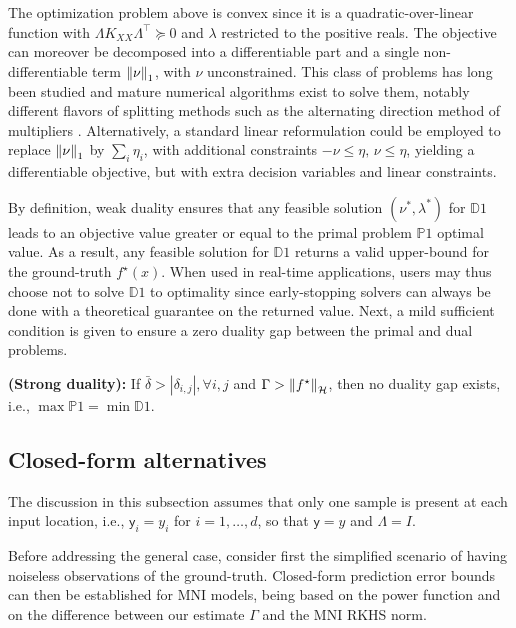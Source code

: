 The optimization problem above is convex since it is a quadratic-over-linear function with $\Lambda K_{XX} \Lambda^\top \succeq 0$ and $\lambda$ restricted to the positive reals. The objective can moreover be decomposed into a differentiable part and a single non-differentiable term $\left\| \nu \right\|_1$, with $\nu$ unconstrained. This class of problems has long been studied and mature numerical algorithms exist to solve them, notably different flavors of splitting methods such as the alternating direction method of multipliers \cite[§6]{boyd2011distributed}. Alternatively, a standard linear reformulation could be employed to replace $\left\| \nu \right\|_1$ by $\sum_i \eta_i$, with additional constraints $-\nu \leq \eta, \, \nu \leq \eta$, yielding a differentiable objective, but with extra decision variables and linear constraints. 

By definition, weak duality \citep[§5]{bertsekas2009convex} ensures that any feasible solution $(\nu^*,\lambda^*)$ for $\mathds{D}1$ leads to an objective value greater or equal to the primal problem $\mathds{P}1$ optimal value. As a result, any feasible solution for $\mathds{D}1$ returns a valid upper-bound for the ground-truth  $f^\star(x)$. When used in real-time applications, users may thus choose not to solve $\mathds{D}1$ to optimality since early-stopping solvers can always be done with a theoretical guarantee on the returned value. Next, a mild sufficient condition is given to ensure a zero duality gap between the primal and dual problems.

\begin{proposition}
	\label{prop.strong_duality}
	{\normalfont \textbf{(Strong duality):}}
	If $\bar \delta > |\delta_{i,j}|, \forall i, j$ and $\Gamma > \left\| f^\star \right\|_\mathcal{H}$, then no duality gap exists, i.e., $\max \mathds{P}1 = \min \mathds{D}1$.
\end{proposition}


\subsection{Closed-form alternatives}

The discussion in this subsection assumes that only one sample is present at each input location, i.e., $\mathsf{y}_i = y_i$ for $i=1,\dots,d $, so that $\mathsf{y}=y$ and $\Lambda = I$.

Before addressing the general case, consider first the simplified scenario of having noiseless observations of the ground-truth. Closed-form prediction error bounds can then be established for MNI models, being based on the power function and on the  difference between our estimate $\Gamma$ and the MNI RKHS norm.

